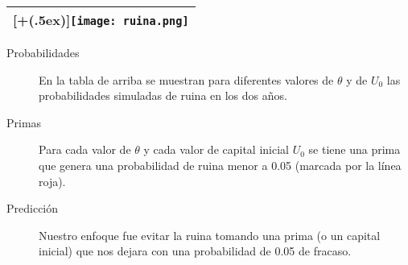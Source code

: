 \documentclass[DIV=calc, 
					paper=letter, 
					fontsize=11pt, 
					twocolumn]{scrartcl}
\newcommand*{\addheight}[2][.5ex]{%
  \raisebox{0pt}[\dimexpr\height+(#1)\relax]{#2}%
}
\begin{document}
\begin{tabular}{|c|}
	\hline
  	\addheight{\texttt{[image: ruina.png]}}\\
	\hline
\end{tabular}

\begin{description}
\item[Probabilidades] En la tabla de arriba se muestran para diferentes valores de $\theta$ y de $U_0$ las probabilidades simuladas de ruina en los dos a\~{n}os.
\item[Primas] Para cada valor de $\theta$ y cada valor de capital inicial $U_0$ se tiene una prima que genera una probabilidad de ruina menor a 0.05 (marcada por la l\'inea roja).
\item[Predicci\'on] Nuestro enfoque fue evitar la ruina tomando una prima (o un capital inicial) que nos dejara con una probabilidad de 0.05 de fracaso.  
\end{description}

%
% 
%
%
%
%
%
%

\end{document}
